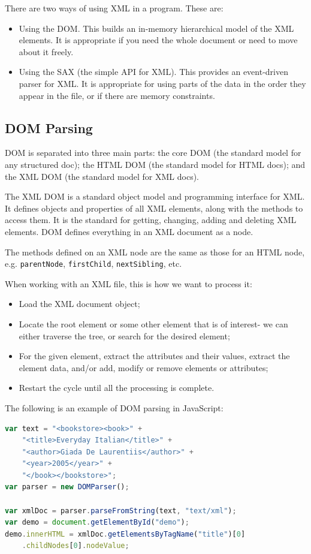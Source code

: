 \documentclass[a4paper, openany]{memoir}
\begin{document}
There are two ways of using XML in a program. These are:
\begin{itemize}
    \item Using the DOM. This builds an in-memory hierarchical model of the XML elements. It is appropriate if you need the whole document or need to move about it freely.
    \item Using the SAX (the simple API for XML). This provides an event-driven parser for XML. It is appropriate for using parts of the data in the order they appear in the file, or if there are memory constraints.
\end{itemize}

\subsection{DOM Parsing}
DOM is separated into three main parts: the core DOM (the standard model for any structured doc); the HTML DOM (the standard model for HTML docs); and the XML DOM (the standard model for XML docs).

\noindent The XML DOM is a standard object model and programming interface for XML. It defines objects and properties of all XML elements, along with the methods to access them. It is the standard for getting, changing, adding and deleting XML elements. DOM defines everything in an XML document as a node.

\noindent The methods defined on an XML node are the same as those for an HTML node, e.g. \texttt{parentNode}, \texttt{firstChild}, \texttt{nextSibling}, etc.

\noindent When working with an XML file, this is how we want to process it:
\begin{itemize}
    \item Load the XML document object;
    \item Locate the root element or some other element that is of interest- we can either traverse the tree, or search for the desired element;
    \item For the given element, extract the attributes and their values, extract the element data, and/or add, modify or remove elements or attributes;
    \item Restart the cycle until all the processing is complete.
\end{itemize}
The following is an example of DOM parsing in JavaScript:
\begin{lstlisting}[language=javascript]
var text = "<bookstore><book>" + 
    "<title>Everyday Italian</title>" + 
    "<author>Giada De Laurentiis</author>" + 
    "<year>2005</year>" + 
    "</book></bookstore>";
var parser = new DOMParser();

var xmlDoc = parser.parseFromString(text, "text/xml");
var demo = document.getElementById("demo");
demo.innerHTML = xmlDoc.getElementsByTagName("title")[0]
    .childNodes[0].nodeValue;
\end{lstlisting}
\end{document}
